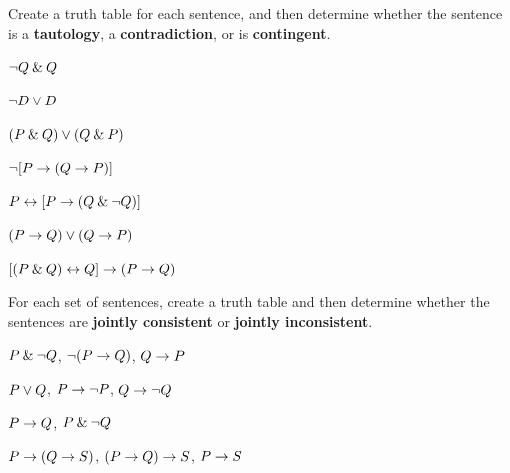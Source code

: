 \begin{small}


\problempart Create a truth table for each sentence, and then determine whether the sentence is a \textbf{tautology}, a \textbf{contradiction}, or is \textbf{contingent}.

\begin{earg}
\item ${\neg} Q \mathbin{\&} Q$ \vspace{.5ex}%
\item ${\neg} D \vee D$ \vspace{.5ex}%
\item $(P \mathbin{\&} Q) \vee (Q\mathbin{\&} P)$\vspace{.5ex} %
\item ${\neg}[P \rightarrow (Q \rightarrow P)]$\vspace{.5ex} %
\item $P \leftrightarrow [P \rightarrow (Q \mathbin{\&} {\neg} Q)]$ \vspace{.5ex}%
\item $(P \rightarrow Q) \vee (Q \rightarrow P)$ %
\item $[(P \mathbin{\&} Q) \leftrightarrow Q] \rightarrow (P \rightarrow Q)$ \vspace{.5ex}%
\end{earg}


\problempart
\label{pr.TT.consistent}
For each set of sentences, create a truth table and then determine whether the sentences are \textbf{jointly consistent} or \textbf{jointly inconsistent}.
\begin{earg}

\item $P \mathbin{\&} {\neg} Q$, ${\neg}(P \rightarrow Q)$, $Q \rightarrow P$\vspace{.5ex} %
\item $P \vee Q$, $P \rightarrow {\neg} P$, $Q \rightarrow {\neg} Q$ \vspace{.5ex}%
\item $P \rightarrow Q$, $P \mathbin{\&} {\neg} Q$\vspace{.5ex} %
\item $P \rightarrow (Q \rightarrow S)$, $(P \rightarrow Q) \rightarrow S$, $P \rightarrow S$\vspace{.5ex} %


\end{earg}
\end{small}

